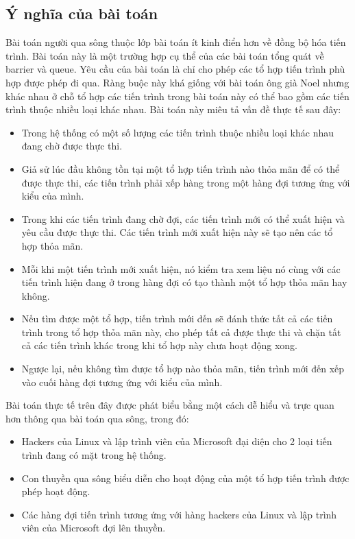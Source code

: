 \subsection{Ý nghĩa của bài toán}
Bài toán người qua sông thuộc lớp bài toán ít kinh điển hơn về đồng bộ hóa tiến trình. Bài toán này là một trường hợp cụ thể của các bài toán tổng quát về barrier và queue. Yêu cầu của bài toán là chỉ cho phép các tổ hợp tiến trình phù hợp được phép đi qua. Ràng buộc này khá giống với bài toán ông già Noel nhưng khác nhau ở chỗ tổ hợp các tiến trình trong bài toán này có thể bao gồm các tiến trình thuộc nhiều loại khác nhau. Bài toán này miêu tả vấn đề thực tế sau đây:
\begin{itemize}
	\item Trong hệ thống có một số lượng các tiến trình thuộc nhiều loại khác nhau đang chờ được thực thi.
	\item Giả sử lúc đầu không tồn tại một tổ hợp tiến trình nào thỏa mãn để có thể được thực thi, các tiến trình phải xếp hàng trong một hàng đợi tương ứng với kiểu của mình. 
	\item Trong khi các tiến trình đang chờ đợi, các tiến trình mới có thể xuất hiện và yêu cầu được thực thi. Các tiến trình mới xuất hiện này sẽ tạo nên các tổ hợp thỏa mãn. 
	\item Mỗi khi một tiến trình mới xuất hiện, nó kiểm tra xem liệu nó cùng với các tiến trình hiện đang ở trong hàng đợi có tạo thành một tổ hợp thỏa mãn hay không. 
	\item Nếu tìm được một tổ hợp, tiến trình mới đến sẽ đánh thức tất cả các tiến trình trong tổ hợp thỏa mãn này, cho phép tất cả được thực thi và chặn tất cả các tiến trình khác trong khi tổ hợp này chưa hoạt động xong.
	\item Ngược lại, nếu không tìm được tổ hợp nào thỏa mãn, tiến trình mới đến xếp vào cuối hàng đợi tương ứng với kiểu của mình. 
\end{itemize}
Bài toán thực tế trên đây được phát biểu bằng một cách dễ hiểu và trực quan hơn thông qua bài toán qua sông, trong đó:
\begin{itemize}
	\item Hackers của Linux và lập trình viên của Microsoft đại diện cho 2 loại tiến trình đang có mặt trong hệ thống.
	\item Con thuyền qua sông biểu diễn cho hoạt động của một tổ hợp tiến trình được phép hoạt động.
	\item Các hàng đợi tiến trình tương ứng với hàng hackers của Linux và lập trình viên của Microsoft đợi lên thuyền.
\end{itemize}
